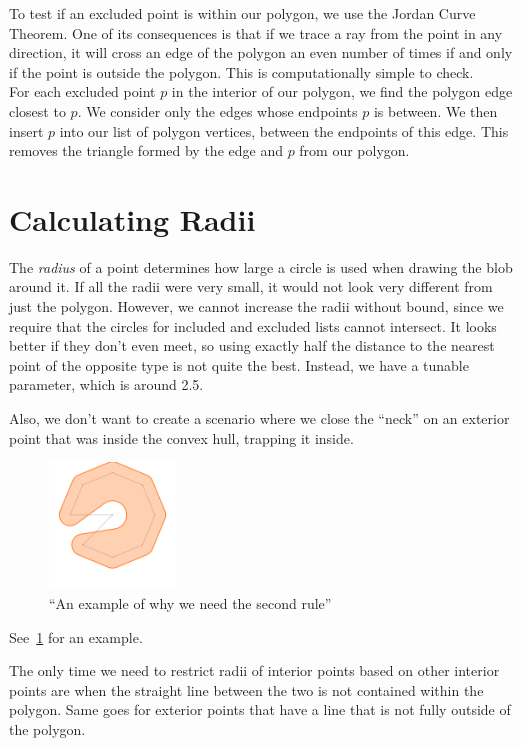 \documentclass[paper=a4, fontsize=11pt]{scrartcl} %
\numberwithin{equation}{section} %
\numberwithin{figure}{section} %
\numberwithin{table}{section} %
\begin{document}
To test if an excluded point is within our polygon, we use the Jordan Curve
Theorem. One of its consequences is that if we trace a ray from the point in any
direction, it will cross an edge of the polygon an even number of times if and
only if the point is outside the polygon.  This is computationally simple to
check. \\

For each excluded point $p$ in the interior of our polygon, we find the polygon
edge closest to $p$. We consider only the edges whose endpoints $p$ is between.
We then insert $p$ into our list of polygon vertices, between the endpoints of
this edge. This removes the triangle formed by the edge and $p$ from our
polygon.


\section{Calculating Radii}
The \textit{radius} of a point determines how large a circle is used when
drawing the blob around it.  If all the radii were very small, it would not
look very different from just the polygon.  However, we cannot increase the
radii without bound, since we require that the circles for included and
excluded lists cannot intersect.  It looks better if they don't even meet,
so using exactly half the distance to the nearest point of the opposite type
is not quite the best.
Instead, we have a tunable parameter,
which is around 2.5. %

Also, we don't want to create a scenario where we close the ``neck''
on an exterior point that was inside the convex hull, trapping it inside.

\begin{figure}[h]
\includegraphics[width=0.3\textwidth]{torus_bitten}
\centering
\caption{``An example of why we need the second rule''}
\label{fig:neck}
\end{figure}

See~\ref{fig:neck} for an example.

The only time we need to restrict radii of interior points based on other
interior points are when the straight line between the two is not
contained within the polygon.  Same goes for exterior points that have a line
that is not fully outside of the polygon.
\end{document}
